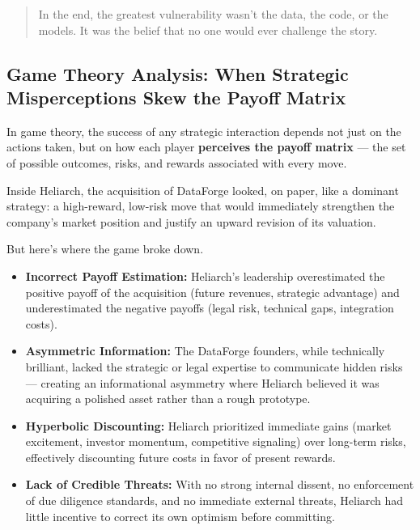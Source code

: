 \begin{quote}
    In the end, the greatest vulnerability wasn’t the data, the code, or the models.  
    It was the belief that no one would ever challenge the story.
\end{quote}

\subsection{Game Theory Analysis: When Strategic Misperceptions Skew the Payoff Matrix}

In game theory, the success of any strategic interaction depends not just on the actions taken,  
but on how each player \textbf{perceives the payoff matrix} — the set of possible outcomes, risks, and rewards associated with every move.

\medskip

Inside Heliarch, the acquisition of DataForge looked, on paper, like a dominant strategy:  
a high-reward, low-risk move that would immediately strengthen the company’s market position and justify an upward revision of its valuation.

\medskip

But here’s where the game broke down.

\begin{itemize}
    \item \textbf{Incorrect Payoff Estimation:}  
    Heliarch’s leadership overestimated the positive payoff of the acquisition (future revenues, strategic advantage) and underestimated the negative payoffs (legal risk, technical gaps, integration costs).

    \item \textbf{Asymmetric Information:}  
    The DataForge founders, while technically brilliant, lacked the strategic or legal expertise to communicate hidden risks — creating an informational asymmetry where Heliarch believed it was acquiring a polished asset rather than a rough prototype.

    \item \textbf{Hyperbolic Discounting:}  
    Heliarch prioritized immediate gains (market excitement, investor momentum, competitive signaling) over long-term risks, effectively discounting future costs in favor of present rewards.

    \item \textbf{Lack of Credible Threats:}  
    With no strong internal dissent, no enforcement of due diligence standards, and no immediate external threats, Heliarch had little incentive to correct its own optimism before committing.
\end{itemize}

